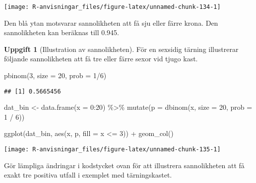 \documentclass[
]{book}
\newenvironment{Shaded}{\begin{snugshade}}{\end{snugshade}}
\newcommand{\AttributeTok}[1]{\textcolor[rgb]{0.77,0.63,0.00}{#1}}
\newcommand{\DecValTok}[1]{\textcolor[rgb]{0.00,0.00,0.81}{#1}}
\newcommand{\FunctionTok}[1]{\textcolor[rgb]{0.00,0.00,0.00}{#1}}
\newcommand{\NormalTok}[1]{#1}
\newcommand{\OtherTok}[1]{\textcolor[rgb]{0.56,0.35,0.01}{#1}}
\newcommand{\SpecialCharTok}[1]{\textcolor[rgb]{0.00,0.00,0.00}{#1}}
\theoremstyle{definition}
\theoremstyle{definition}
\theoremstyle{definition}
\newtheorem{exercise}{Uppgift}[chapter]
\theoremstyle{definition}
\theoremstyle{remark}
\begin{document}
\begin{center}\texttt{[image: R-anvisningar\_files/figure-latex/unnamed-chunk-134-1]} \end{center}

Den blå ytan motsvarar sannolikheten att få sju eller färre krona. Den sannolikheten kan beräknas till 0.945.

\begin{exercise}[Illustration av sannolikheten]
För en sexsidig tärning illustrerar följande sannolikheten att få tre eller färre sexor vid tjugo kast.

\begin{Shaded}
\begin{Highlighting}[]
\FunctionTok{pbinom}\NormalTok{(}\DecValTok{3}\NormalTok{, }\AttributeTok{size =} \DecValTok{20}\NormalTok{, }\AttributeTok{prob =} \DecValTok{1}\SpecialCharTok{/}\DecValTok{6}\NormalTok{)}
\end{Highlighting}
\end{Shaded}

\begin{verbatim}
## [1] 0.5665456
\end{verbatim}

\begin{Shaded}
\begin{Highlighting}[]
\NormalTok{dat\_bin }\OtherTok{\textless{}{-}} \FunctionTok{data.frame}\NormalTok{(}\AttributeTok{x =} \DecValTok{0}\SpecialCharTok{:}\DecValTok{20}\NormalTok{) }\SpecialCharTok{\%\textgreater{}\%} 
  \FunctionTok{mutate}\NormalTok{(}\AttributeTok{p =} \FunctionTok{dbinom}\NormalTok{(x, }\AttributeTok{size =} \DecValTok{20}\NormalTok{, }\AttributeTok{prob =} \DecValTok{1} \SpecialCharTok{/} \DecValTok{6}\NormalTok{))}

\FunctionTok{ggplot}\NormalTok{(dat\_bin, }\FunctionTok{aes}\NormalTok{(x, p, }\AttributeTok{fill =}\NormalTok{ x }\SpecialCharTok{\textless{}=} \DecValTok{3}\NormalTok{)) }\SpecialCharTok{+}
  \FunctionTok{geom\_col}\NormalTok{()}
\end{Highlighting}
\end{Shaded}

\begin{center}\texttt{[image: R-anvisningar\_files/figure-latex/unnamed-chunk-135-1]} \end{center}

Gör lämpliga ändringar i kodstycket ovan för att illustrera sannolikheten att få exakt tre positiva utfall i exemplet med tärningskastet.
\end{exercise}
\end{document}
